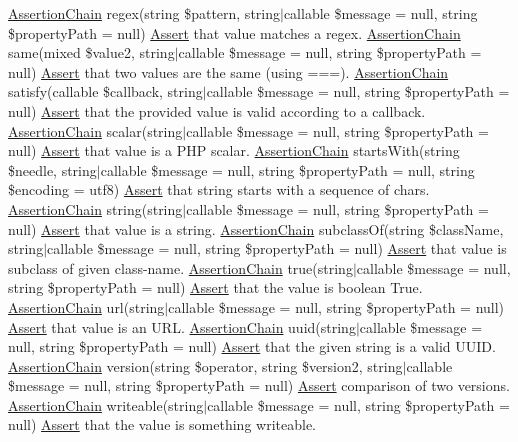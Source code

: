 \mbox{\hyperlink{class_assert_1_1_assertion_chain}{Assertion\+Chain}} regex(string \$pattern, string$\vert$callable \$message = null, string \$property\+Path = null) \mbox{\hyperlink{class_assert_1_1_assert}{Assert}} that value matches a regex.  \mbox{\hyperlink{class_assert_1_1_assertion_chain}{Assertion\+Chain}} same(mixed \$value2, string$\vert$callable \$message = null, string \$property\+Path = null) \mbox{\hyperlink{class_assert_1_1_assert}{Assert}} that two values are the same (using ===).  \mbox{\hyperlink{class_assert_1_1_assertion_chain}{Assertion\+Chain}} satisfy(callable \$callback, string$\vert$callable \$message = null, string \$property\+Path = null) \mbox{\hyperlink{class_assert_1_1_assert}{Assert}} that the provided value is valid according to a callback.  \mbox{\hyperlink{class_assert_1_1_assertion_chain}{Assertion\+Chain}} scalar(string$\vert$callable \$message = null, string \$property\+Path = null) \mbox{\hyperlink{class_assert_1_1_assert}{Assert}} that value is a P\+HP scalar.  \mbox{\hyperlink{class_assert_1_1_assertion_chain}{Assertion\+Chain}} starts\+With(string \$needle, string$\vert$callable \$message = null, string \$property\+Path = null, string \$encoding = \textquotesingle{}utf8\textquotesingle{}) \mbox{\hyperlink{class_assert_1_1_assert}{Assert}} that string starts with a sequence of chars.  \mbox{\hyperlink{class_assert_1_1_assertion_chain}{Assertion\+Chain}} string(string$\vert$callable \$message = null, string \$property\+Path = null) \mbox{\hyperlink{class_assert_1_1_assert}{Assert}} that value is a string.  \mbox{\hyperlink{class_assert_1_1_assertion_chain}{Assertion\+Chain}} subclass\+Of(string \$class\+Name, string$\vert$callable \$message = null, string \$property\+Path = null) \mbox{\hyperlink{class_assert_1_1_assert}{Assert}} that value is subclass of given class-\/name.  \mbox{\hyperlink{class_assert_1_1_assertion_chain}{Assertion\+Chain}} true(string$\vert$callable \$message = null, string \$property\+Path = null) \mbox{\hyperlink{class_assert_1_1_assert}{Assert}} that the value is boolean True.  \mbox{\hyperlink{class_assert_1_1_assertion_chain}{Assertion\+Chain}} url(string$\vert$callable \$message = null, string \$property\+Path = null) \mbox{\hyperlink{class_assert_1_1_assert}{Assert}} that value is an U\+RL.  \mbox{\hyperlink{class_assert_1_1_assertion_chain}{Assertion\+Chain}} uuid(string$\vert$callable \$message = null, string \$property\+Path = null) \mbox{\hyperlink{class_assert_1_1_assert}{Assert}} that the given string is a valid U\+U\+ID.  \mbox{\hyperlink{class_assert_1_1_assertion_chain}{Assertion\+Chain}} version(string \$operator, string \$version2, string$\vert$callable \$message = null, string \$property\+Path = null) \mbox{\hyperlink{class_assert_1_1_assert}{Assert}} comparison of two versions.  \mbox{\hyperlink{class_assert_1_1_assertion_chain}{Assertion\+Chain}} writeable(string$\vert$callable \$message = null, string \$property\+Path = null) \mbox{\hyperlink{class_assert_1_1_assert}{Assert}} that the value is something writeable. 

